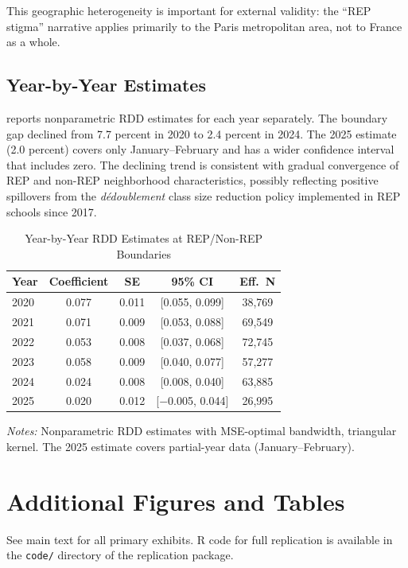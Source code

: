 \documentclass[12pt]{article}
\begin{document}
This geographic heterogeneity is important for external validity: the ``REP stigma'' narrative applies primarily to the Paris metropolitan area, not to France as a whole.

\subsection{Year-by-Year Estimates}

 reports nonparametric RDD estimates for each year separately. The boundary gap declined from 7.7 percent in 2020 to 2.4 percent in 2024. The 2025 estimate (2.0 percent) covers only January--February and has a wider confidence interval that includes zero. The declining trend is consistent with gradual convergence of REP and non-REP neighborhood characteristics, possibly reflecting positive spillovers from the \textit{d\'{e}doublement} class size reduction policy implemented in REP schools since 2017.

\begin{table}[htbp]
\centering
\caption{Year-by-Year RDD Estimates at REP/Non-REP Boundaries}
\label{tab:yearly}
\begin{tabular}{lcccc}
\toprule
Year & Coefficient & SE & 95\% CI & Eff.\ N \\
\midrule
2020 & 0.077 & 0.011 & [0.055, 0.099] & 38,769 \\
2021 & 0.071 & 0.009 & [0.053, 0.088] & 69,549 \\
2022 & 0.053 & 0.008 & [0.037, 0.068] & 72,745 \\
2023 & 0.058 & 0.009 & [0.040, 0.077] & 57,277 \\
2024 & 0.024 & 0.008 & [0.008, 0.040] & 63,885 \\
2025 & 0.020 & 0.012 & [$-$0.005, 0.044] & 26,995 \\
\bottomrule
\end{tabular}
\begin{tablenotes}
\small
\item \textit{Notes:} Nonparametric RDD estimates with MSE-optimal bandwidth, triangular kernel. The 2025 estimate covers partial-year data (January--February).
\end{tablenotes}
\end{table}


\section{Additional Figures and Tables}

See main text for all primary exhibits. R code for full replication is available in the \texttt{code/} directory of the replication package.
\end{document}
